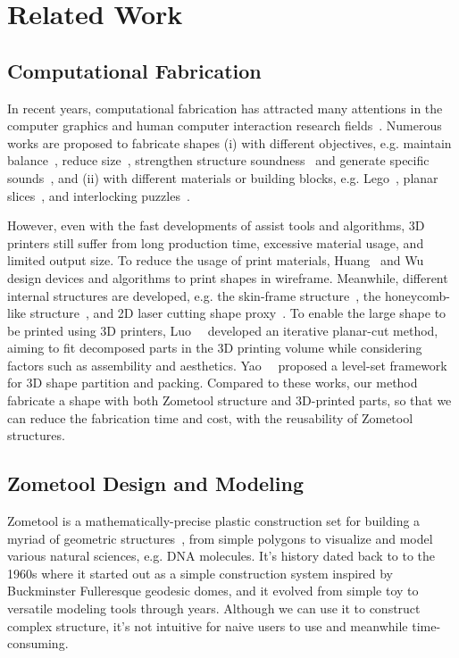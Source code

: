 \section{Related Work}
\label{sec:relatedwork}

\subsection{Computational Fabrication}
In recent years, computational fabrication has attracted many attentions in the computer graphics and human computer interaction research fields~\cite{Shamir:2016:CTP}.
Numerous works are proposed to fabricate shapes 
(i) with different objectives, e.g. maintain balance~\cite{Prevost:MIS:2013,SpinIt:Baecher:2014}, reduce size~\cite{Luo:2012:CPM}, strengthen structure soundness~\cite{Zhou:2013:WSA} and generate specific sounds~\cite{Umetani:2016:PIR}, and 
(ii) with different materials or building blocks, e.g. Lego~\cite{Luo:2015:LOL}, planar slices~\cite{Cignoni:2014:FMJ}, and interlocking puzzles~\cite{Song-2012-InterCubes}.

However, even with the fast developments of assist tools and algorithms, 3D printers still suffer from long production time, excessive material usage, and limited output size.
To reduce the usage of print materials, Huang~\cite{Huang:2016:FRF} and Wu~\cite{Wu:2016:PAM} design devices and algorithms to print shapes in wireframe.
Meanwhile, different internal structures are developed, e.g. the skin-frame structure~\cite{Wang:2013:CPO}, the honeycomb-like structure~\cite{Lu:2014:BSW}, and 2D laser cutting shape proxy~\cite{Song-2016-CofiFab}.
To enable the large shape to be printed using 3D printers, Luo~\etal~\cite{Luo:2012:CPM} developed an iterative planar-cut method, aiming to fit decomposed parts in the 3D printing volume while considering factors such as assembility and aesthetics.
Yao~\etal~\cite{Yao:2015:LPP} proposed a level-set framework for 3D shape partition and packing.
Compared to these works, our method fabricate a shape with both Zometool structure and 3D-printed parts, so that we can reduce the fabrication time and cost, with the reusability of Zometool structures. 

\subsection{Zometool Design and Modeling}
Zometool is a mathematically-precise plastic construction set for building a myriad of geometric structures~\cite{davis2007mathematics}, from simple polygons to visualize and model various natural sciences, e.g. DNA molecules.
It's history dated back to to the 1960s where it started out as a simple construction system inspired by Buckminster Fulleresque geodesic domes, and it evolved from simple toy to versatile modeling tools through years.
Although we can use it to construct complex structure, it's not intuitive for naive users to use and meanwhile time-consuming.

